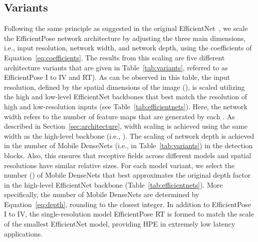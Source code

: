 \subsection{Variants}
\label{sec:variants}

Following the same principle as suggested in the original EfficientNet~\cite{tan2019efficientnet}, we scale the EfficientPose network architecture by adjusting the three main dimensions, i.e., input resolution, network width, and network depth, using the coefficients of Equation~\ref{eq:coefficients}. The results from this scaling are five different architecture variants that are given in Table~\ref{tab:variants}, referred to as EfficientPose I to IV and RT). As can be observed in this table, the input resolution, defined by the spatial dimensions of the image (), is scaled utilizing the high and low-level EfficientNet backbones that best match the resolution of high and low-resolution inputs (see Table~\ref{tab:efficientnets}). Here, the network width refers to the number of feature maps that are generated by each . As described in Section~\ref{sec:architecture}, width scaling is achieved using the same width as the high-level backbone (i.e., ). The scaling of network depth is achieved in the number of Mobile DenseNets (i.e.,  in Table~\ref{tab:variants}) in the detection blocks. Also, this ensures that receptive fields across different models and spatial resolutions have similar relative sizes. For each model variant, we select the number () of Mobile DenseNets that best approximates the original depth factor  in the high-level EfficientNet backbone (Table~\ref{tab:efficientnets}). More specifically, the number of Mobile DenseNets are determined by Equation~\ref{eq:depth}, rounding to the closest integer. In addition to EfficientPose I to IV, the single-resolution model EfficientPose RT is formed to match the scale of the smallest EfficientNet model, providing HPE in extremely low latency applications.



